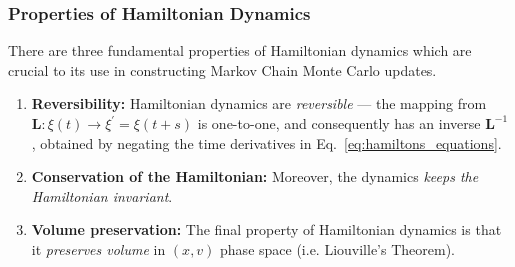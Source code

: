 \documentclass[../main.tex]{subfiles}
\begin{document}
\subsubsection{Properties of Hamiltonian Dynamics}
%
There are three fundamental properties of Hamiltonian dynamics which are crucial to its use in constructing Markov
Chain Monte Carlo updates.
%
\begin{enumerate}
    \item \textbf{Reversibility:} Hamiltonian dynamics are \textit{reversible}
        --- the mapping from $\mathbf{L}: \xi(t) \rightarrow \xi^{\prime} =
        \xi(t + s)$ is one-to-one, and consequently has an inverse
        $\mathbf{L}^{-1}$, obtained by negating the time derivatives in
        Eq.~\ref{eq:hamiltons_equations}.
    \item \textbf{Conservation of the Hamiltonian:} Moreover, the dynamics
        \textit{keeps the Hamiltonian invariant}.
    \item \textbf{Volume preservation:} The final property of Hamiltonian
        dynamics is that it \textit{preserves volume} in $(x, v)$ phase space
        (i.e. Liouville's Theorem).
\end{enumerate}
%
\end{document}
